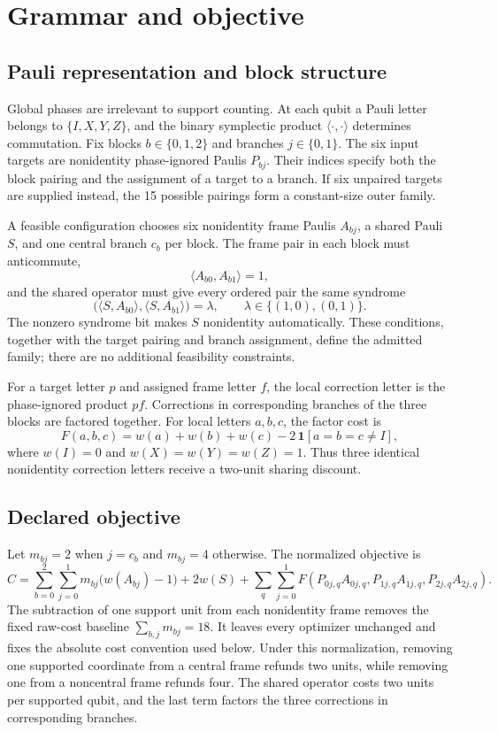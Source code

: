 \section{Grammar and objective}

\subsection{Pauli representation and block structure}
Global phases are irrelevant to support counting. At each qubit a Pauli letter belongs to $\{I,X,Y,Z\}$, and the binary symplectic product $\langle\cdot,\cdot\rangle$ determines commutation. Fix blocks $b\in\{0,1,2\}$ and branches $j\in\{0,1\}$. The six input targets are nonidentity phase-ignored Paulis $P_{bj}$. Their indices specify both the block pairing and the assignment of a target to a branch. If six unpaired targets are supplied instead, the 15 possible pairings form a constant-size outer family.

A feasible configuration chooses six nonidentity frame Paulis $A_{bj}$, a shared Pauli $S$, and one central branch $c_b$ per block. The frame pair in each block must anticommute,
\[
\langle A_{b0},A_{b1}\rangle=1,
\]
and the shared operator must give every ordered pair the same syndrome
\[
\bigl(\langle S,A_{b0}\rangle,\langle S,A_{b1}\rangle\bigr)
=\lambda,
\qquad \lambda\in\{(1,0),(0,1)\}.
\]
The nonzero syndrome bit makes $S$ nonidentity automatically. These conditions, together with the target pairing and branch assignment, define the admitted family; there are no additional feasibility constraints.

For a target letter $p$ and assigned frame letter $f$, the local correction letter is the phase-ignored product $pf$. Corrections in corresponding branches of the three blocks are factored together. For local letters $a,b,c$, the factor cost is
\[
F(a,b,c)=w(a)+w(b)+w(c)-2\,\mathbf 1[a=b=c\ne I],
\]
where $w(I)=0$ and $w(X)=w(Y)=w(Z)=1$. Thus three identical nonidentity correction letters receive a two-unit sharing discount.

\subsection{Declared objective}
Let $m_{bj}=2$ when $j=c_b$ and $m_{bj}=4$ otherwise. The normalized objective is
\[
C=\sum_{b=0}^{2}\sum_{j=0}^{1}m_{bj}\bigl(w(A_{bj})-1\bigr)
  +2w(S)
  +\sum_q\sum_{j=0}^{1}
    F\!\left(P_{0j,q}A_{0j,q},P_{1j,q}A_{1j,q},P_{2j,q}A_{2j,q}\right).
\]
The subtraction of one support unit from each nonidentity frame removes the fixed raw-cost baseline $\sum_{b,j}m_{bj}=18$. It leaves every optimizer unchanged and fixes the absolute cost convention used below. Under this normalization, removing one supported coordinate from a central frame refunds two units, while removing one from a noncentral frame refunds four. The shared operator costs two units per supported qubit, and the last term factors the three corrections in corresponding branches.

